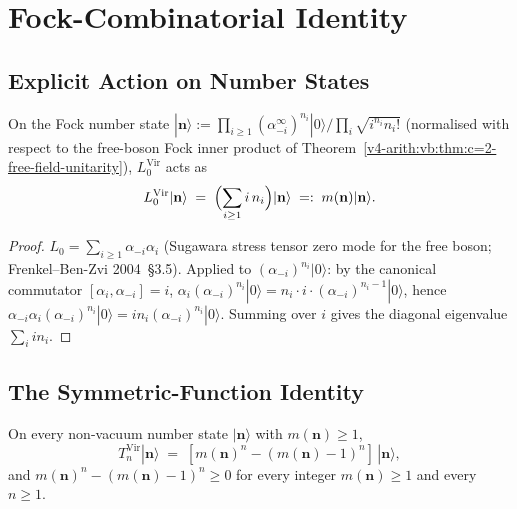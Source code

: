 \section{Fock-Combinatorial Identity}
\label{v4-arith:vb:fock-combinatorial}

\subsection{Explicit Action on Number States}
\label{v4-arith:vb:number-states}

\begin{lemma}
\label{v4-arith:vb:lem:diagonal-action}
On the Fock number state
\(|\mathbf{n}\rangle:=\prod_{i\geq 1}(\alpha_{-i}^{\infty})^{n_{i}}|0\rangle\big/\prod_{i}\sqrt{i^{n_{i}}n_{i}!}\)
(normalised with respect to the free-boson Fock inner product of
Theorem~\ref{v4-arith:vb:thm:c=2-free-field-unitarity}), \(L_{0}^{\mathrm{Vir}}\)
acts as
\begin{equation}
\label{v4-arith:vb:eq:L_0-action}
L_{0}^{\mathrm{Vir}}|\mathbf{n}\rangle\;=\;\Bigl(\sum_{i\geq 1}i\,n_{i}\Bigr)|\mathbf{n}\rangle\;=:\;m(\mathbf{n})|\mathbf{n}\rangle.
\end{equation}
\end{lemma}

\begin{proof}
\(L_{0}=\sum_{i\geq 1}\alpha_{-i}\alpha_{i}\) (Sugawara stress tensor
zero mode for the free boson; Frenkel--Ben-Zvi 2004~\S3.5). Applied
to \((\alpha_{-i})^{n_{i}}|0\rangle\): by the canonical commutator
\([\alpha_{i},\alpha_{-i}]=i\), \(\alpha_{i}(\alpha_{-i})^{n_{i}}|0\rangle=n_{i}\cdot i\cdot(\alpha_{-i})^{n_{i}-1}|0\rangle\),
hence \(\alpha_{-i}\alpha_{i}(\alpha_{-i})^{n_{i}}|0\rangle=i n_{i}(\alpha_{-i})^{n_{i}}|0\rangle\).
Summing over \(i\) gives the diagonal eigenvalue \(\sum_{i}i n_{i}\).
\end{proof}

\subsection{The Symmetric-Function Identity}
\label{v4-arith:vb:symmetric-identity}

\begin{theorem}
\label{v4-arith:vb:thm:fock-combinatorial-positivity}
On every non-vacuum number state
\(|\mathbf{n}\rangle\) with \(m(\mathbf{n})\geq 1\),
\begin{equation}
\label{v4-arith:vb:eq:fock-positivity}
T_{n}^{\mathrm{Vir}}|\mathbf{n}\rangle\;=\;[m(\mathbf{n})^{n}-(m(\mathbf{n})-1)^{n}]\,|\mathbf{n}\rangle,
\end{equation}
and \(m(\mathbf{n})^{n}-(m(\mathbf{n})-1)^{n}\geq 0\) for every
integer \(m(\mathbf{n})\geq 1\) and every \(n\geq 1\).
\end{theorem}


